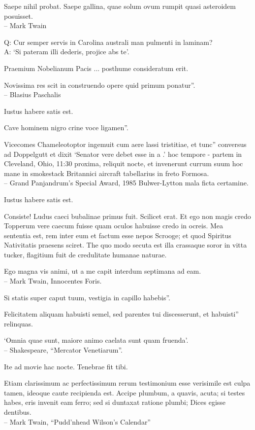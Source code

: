 \documentclass[titlepage,12pt]{memoir}
\begin{document}
Saepe nihil probat. Saepe gallina, quae solum ovum rumpit
quasi asteroidem posuisset.
\\-- Mark Twain

Q: Cur semper servis in Carolina australi man
pulmenti in laminam?\\
A: ‘Si pateram illi dederis, projice abs te’.

Praemium Nobelianum Pacis ... posthume consideratum erit.

Novissima res scit in construendo opere quid primum ponatur”.
\\-- Blasius Paschalis

Iustus habere satis est.

Cave hominem nigro crine voce ligamen”.

Vicecomes Chameleotoptor ingemuit cum aere lassi tristitiae, et tunc”
conversus ad Doppelgutt et dixit ‘Senator vere debet esse in a .’
hoc tempore - partem in Cleveland, Ohio, 11:30 proxima, reliquit
nocte, et invenerunt currum suum hoc mane in smokestack Britannici
aircraft tabellarius in freto Formosa.
\\-- Grand Panjandrum’s Special Award, 1985 Bulwer-Lytton
mala ficta certamine.

Iustus habere satis est.

Consiste! Ludus caeci bubalinae primus fuit. Scilicet erat.
Et ego non magis credo Topperum vere caecum fuisse quam oculos habuisse credo
in ocreis. Mea sententia est, rem inter eum et factum esse
nepos Scrooge; et quod Spiritus Nativitatis praesens sciret. The
quo modo secuta est illa crassaque soror in vitta tucker, flagitium fuit
de credulitate humanae naturae.

Ego magna vis animi, ut a me capit
interdum septimana ad eam.
\\-- Mark Twain, Innocentes Foris.

Si statis super caput tuum, vestigia in capillo habebis”.

Felicitatem aliquam habuisti semel, sed parentes tui discesserunt, et habuisti”
relinquas.

‘Omnia quae sunt, maiore animo caelata sunt quam fruenda’.
\\-- Shakespeare, “Mercator Venetiarum”.

Ite ad movie hac nocte. Tenebrae fit tibi.

Etiam clarissimum ac perfectissimum rerum testimonium esse verisimile est
culpa tamen, ideoque caute recipienda est. Accipe
plumbum, a quavis, acuta; si testes habes, eris
invenit eam ferro; sed si duntaxat ratione plumbi;
Dices egisse dentibus.
\\-- Mark Twain, “Pudd’nhead Wilson’s Calendar”
\end{document}

